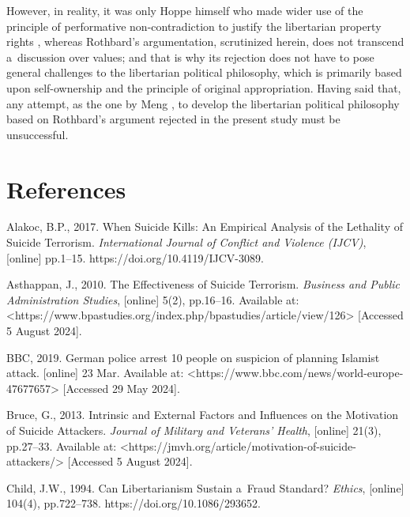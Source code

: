 However, in reality, it was only Hoppe himself who made wider use of the principle of performative non-contradiction to justify the libertarian property rights 
\parencites[see][]{}[][ch. 7]{}, %
 whereas Rothbard's argumentation, scrutinized herein, does not transcend a~discussion over values; and that is why its rejection does not have to pose general challenges to the libertarian political philosophy, which is primarily based upon self-ownership and the principle of original appropriation. Having said that, any attempt, as the one by Meng 
\parencite*[][]{}, %
 to develop the libertarian political philosophy based on Rothbard's argument rejected in the present study must be unsuccessful.



\section{References}

Alakoc, B.P., 2017. When Suicide Kills: An Empirical Analysis of the Lethality of Suicide Terrorism. \textit{International Journal of Conflict and Violence (IJCV)}, [online] pp.1–15. https://doi.org/10.4119/IJCV-3089.



Asthappan, J., 2010. The Effectiveness of Suicide Terrorism. \textit{Business and Public Administration Studies}, [online] 5(2), pp.16–16. Available at: {\textless}https://www.bpastudies.org/index.php/bpastudies/article/view/126{\textgreater} [Accessed 5 August 2024].



BBC, 2019. German police arrest 10 people on suspicion of planning Islamist attack. [online] 23 Mar. Available at: {\textless}https://www.bbc.com/news/world-europe-47677657{\textgreater} [Accessed 29 May 2024].



Bruce, G., 2013. Intrinsic and External Factors and Influences on the Motivation of Suicide Attackers. \textit{Journal of Military and Veterans' Health}, [online] 21(3), pp.27–33. Available at: {\textless}https://jmvh.org/article/motivation-of-suicide-attackers/{\textgreater} [Accessed 5 August 2024].



Child, J.W., 1994. Can Libertarianism Sustain a~Fraud Standard? \textit{Ethics}, [online] 104(4), pp.722–738. https://doi.org/10.1086/293652.



